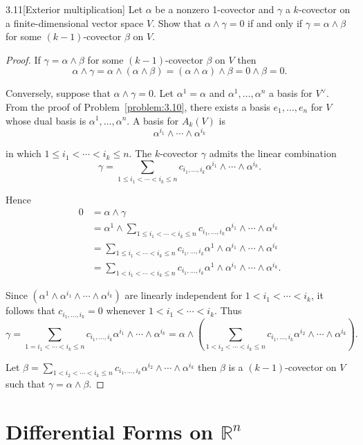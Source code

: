 \begin{problem}{3.11}[Exterior multiplication]
Let \( \alpha \) be a nonzero 1-covector and \( \gamma \) a \( k \)-covector on a finite-dimensional vector space \( V \). Show that \( \alpha \land \gamma = 0 \) if and only if \( \gamma = \alpha \land \beta \) for some \( (k-1) \)-covector \( \beta \) on \( V \).
\end{problem}

\begin{proof}
	If \( \gamma = \alpha \wedge \beta \) for some \( (k - 1) \)-covector \( \beta \) on \( V \) then
	\[
		\alpha \wedge \gamma = \alpha \wedge (\alpha \wedge \beta) = (\alpha \wedge \alpha) \wedge \beta = 0 \wedge \beta = 0.
	\]

	Conversely, suppose that \( \alpha \wedge \gamma = 0 \). Let \( \alpha^{1} = \alpha \) and \( \alpha^{1}, \ldots, \alpha^{n} \) a basis for \( V^{\vee} \). From the proof of Problem~\ref{problem:3.10}, there exists a basis \( e_{1}, \ldots, e_{n} \) for \( V \) whose dual basis is \( \alpha^{1}, \ldots, \alpha^{n} \). A basis for \( A_{k}(V) \) is
	\[
		\alpha^{i_{1}} \wedge \cdots \wedge \alpha^{i_{k}}
	\]

	in which \( 1 \leq i_{1} < \cdots < i_{k} \leq n \). The \( k \)-covector \( \gamma \) admits the linear combination
	\[
		\gamma = \sum_{1 \leq i_{1} < \cdots < i_{k} \leq n} c_{i_{1},\ldots,i_{k}} \alpha^{i_{1}} \wedge \cdots \wedge \alpha^{i_{k}}.
	\]

	Hence
	\begingroup
	\allowdisplaybreaks%
	\begin{align*}
		0 & = \alpha \wedge \gamma                                                                                                                    \\
		  & = \alpha^{1} \wedge \sum_{1 \leq i_{1} < \cdots < i_{k} \leq n} c_{i_{1},\ldots,i_{k}} \alpha^{i_{1}} \wedge \cdots \wedge \alpha^{i_{k}} \\
		  & = \sum_{1 \leq i_{1} < \cdots < i_{k} \leq n} c_{i_{1},\ldots,i_{k}} \alpha^{1}\wedge \alpha^{i_{1}} \wedge \cdots \wedge \alpha^{i_{k}}  \\
		  & = \sum_{1 < i_{1} < \cdots < i_{k} \leq n} c_{i_{1},\ldots,i_{k}} \alpha^{1}\wedge \alpha^{i_{1}} \wedge \cdots \wedge \alpha^{i_{k}}.
	\end{align*}
	\endgroup

	Since \( (\alpha^{1}\wedge \alpha^{i_{1}} \wedge \cdots \wedge \alpha^{i_{k}}) \) are linearly independent for \( 1 < i_{1} < \cdots < i_{k} \), it follows that \( c_{i_{1},\ldots,i_{k}} = 0 \) whenever \( 1 < i_{1} < \cdots < i_{k} \). Thus
	\[
		\gamma = \sum_{1 = i_{1} < \cdots < i_{k} \leq n} c_{i_{1},\ldots,i_{k}} \alpha^{i_{1}} \wedge \cdots \wedge \alpha^{i_{k}} = \alpha \wedge \left(\sum_{1 < i_{2} < \cdots < i_{k} \leq n} c_{i_{1},\ldots,i_{k}} \alpha^{i_{2}} \wedge \cdots \wedge \alpha^{i_{k}}\right).
	\]

	Let \( \beta = \sum_{1 < i_{2} < \cdots < i_{k} \leq n} c_{i_{1},\ldots,i_{k}} \alpha^{i_{2}} \wedge \cdots \wedge \alpha^{i_{k}} \) then \( \beta \) is a \( (k-1) \)-covector on \( V \) such that \( \gamma = \alpha \wedge \beta \).
\end{proof}

\section{Differential Forms on \( \mathbb{R}^{n} \)}
